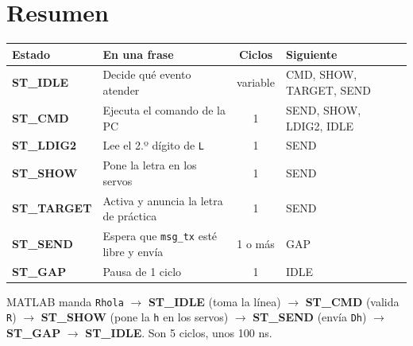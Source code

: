 \documentclass[11pt,a4paper]{article}
\newcommand{\cod}[1]{\texttt{#1}}
\begin{document}
\section{Resumen}

\noindent{}
\begin{tabularx}{\linewidth}{>{\bfseries}l L c >{\raggedright\arraybackslash}p{4.2cm}}
\toprule
{}\textbf{Estado} & \textbf{En una frase} & \textbf{Ciclos} & \textbf{Siguiente} \\
\midrule
ST\_IDLE & Decide qué evento atender & variable & CMD, SHOW, TARGET, SEND \\
ST\_CMD & Ejecuta el comando de la PC & 1 & SEND, SHOW, LDIG2, IDLE \\
ST\_LDIG2 & Lee el 2.º dígito de \cod{L} & 1 & SEND \\
ST\_SHOW & Pone la letra en los servos & 1 & SEND \\
ST\_TARGET & Activa y anuncia la letra de práctica & 1 & SEND \\
ST\_SEND & Espera que \cod{msg\_tx} esté libre y envía & 1 o más & GAP \\
ST\_GAP & Pausa de 1 ciclo & 1 & IDLE \\
\bottomrule
\end{tabularx}

\medskip
\begin{idea}
MATLAB manda \cod{Rhola} $\to$ \textbf{ST\_IDLE} (toma la línea) $\to$ \textbf{ST\_CMD}
(valida \cod{R}) $\to$ \textbf{ST\_SHOW} (pone la \cod{h} en los servos) $\to$
\textbf{ST\_SEND} (envía \cod{Dh}) $\to$ \textbf{ST\_GAP} $\to$ \textbf{ST\_IDLE}.
Son 5 ciclos, unos 100 ns.
\end{idea}
\end{document}
